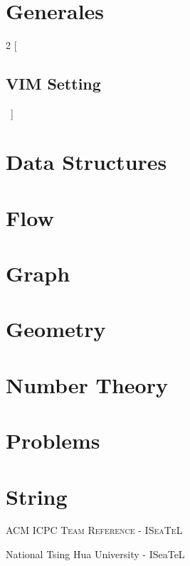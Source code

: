 \documentclass[a4paper]{amsart}
\newcommand{\includecpp}[3]{
  \begin{multicols}{2}
    [\subsection{#1}\ ]
    
  \end{multicols}
}
\begin{document}
  \thispagestyle{fancy}
  \begin{center}

    \

  \end{center}

  \section{Generales}
   \includecpp{VIM Setting}{./Generales}{vimrc.cpp}
 
  \section{Data Structures}

  \section{Flow}
  
  \section{Graph}
  
  \section{Geometry}   
    
  \section{Number Theory}

  \section{Problems}
       
  \section{String}
     

  \enlargethispage*{\baselineskip}
  \pagebreak

  \begin{center}
    \Huge\textsc{ACM ICPC Team Reference - ISeaTeL}

    \vspace{0.35cm}

    \huge National Tsing Hua University - ISeaTeL

    \vspace{0.35cm}

  \end{center}
\end{document}
